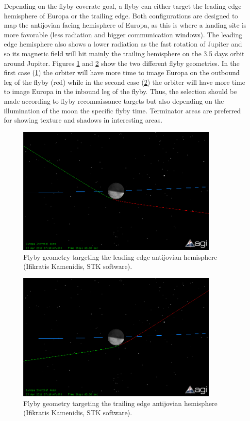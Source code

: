 Depending on the flyby coverate goal, a flyby can either target the leading edge hemisphere of Europa or the trailing edge. Both configurations are designed to map the antijovian facing hemisphere of Europa, as this is where a landing site is more favorable (less radiation and bigger communication windows). The leading edge hemisphere also shows a lower radiation as the fast rotation of Jupiter and so its magnetic field will hit mainly the trailing hemisphere on the 3.5 days orbit around Jupiter. Figures \ref{flyby1} and \ref{flyby2} show the two different flyby geometries. In the first case (\ref{flyby1}) the orbiter will have more time to image Europa on the outbound leg of the flyby (red) while in the second case (\ref{flyby2}) the orbiter will have more time to image Europa in the inbound leg of the flyby. Thus, the selection should be made according to flyby reconnaissance targets but also depending on the illumination of the moon the specific flyby time. Terminator areas are preferred for showing texture and shadows in interesting areas.
\begin{figure}[htb!]
\centering
\includegraphics[width=0.9\textwidth]{figures/Orbiter/flyby1.png}
\caption{Flyby geometry targeting the leading edge antijovian hemisphere (Ifikratis Kamenidis, STK software).}
\label{flyby1}
\end{figure}

\begin{figure}[htb!]
\centering
\includegraphics[width=0.9\textwidth]{figures/Orbiter/flyby2.png}
\caption{Flyby geometry targeting the trailing edge antijovian hemisphere (Ifikratis Kamenidis, STK software).}
\label{flyby2}
\end{figure}

